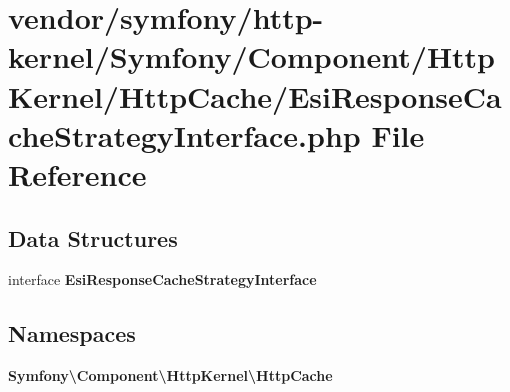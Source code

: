 \section{vendor/symfony/http-\/kernel/\+Symfony/\+Component/\+Http\+Kernel/\+Http\+Cache/\+Esi\+Response\+Cache\+Strategy\+Interface.php File Reference}
\label{_esi_response_cache_strategy_interface_8php}
\subsection*{Data Structures}
\begin{DoxyCompactItemize}
\item 
interface {\bf Esi\+Response\+Cache\+Strategy\+Interface}
\end{DoxyCompactItemize}
\subsection*{Namespaces}
\begin{DoxyCompactItemize}
\item 
 {\bf Symfony\textbackslash{}\+Component\textbackslash{}\+Http\+Kernel\textbackslash{}\+Http\+Cache}
\end{DoxyCompactItemize}
